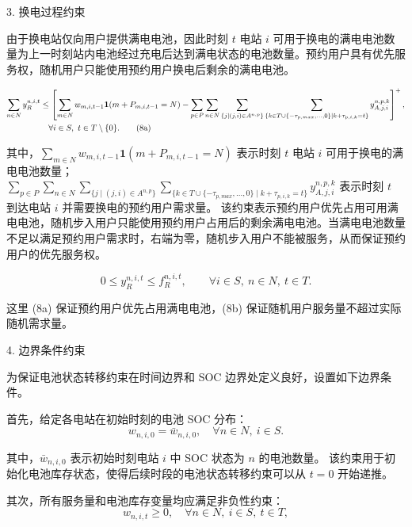 \documentclass[12pt,hyperref,a4paper,UTF8]{ctexart}
\begin{document}
3. 换电过程约束

由于换电站仅向用户提供满电电池，因此时刻 $t$ 电站 $i$ 可用于换电的满电电池数量为上一时刻站内电池经过充电后达到满电状态的电池数量。预约用户具有优先服务权，随机用户只能使用预约用户换电后剩余的满电电池。

\begin{align}
\sum_{n\in N} y^{n,i,t}_{R}
&\le
\left[
\sum_{m\in N} w_{m,i,t-1}
\mathbf{1}\!\left(m+P_{m,i,t-1}=N\right)
-
\sum_{p\in P}
\sum_{n\in N}
\sum_{\{j\mid (j,i)\in A^{n,p}\}}
\sum_{\{k\in T\cup\{-\tau_{p,max},...,0\}\mid k+\tau_{p,i,k}=t\}}
y^{n,p,k}_{A,j,i}
\right]^+, \notag \\  %
&\quad \forall i\in S,\ t\in T\setminus\{0\}.
\tag{8a}
\end{align}

其中，$\sum_{m\in N} w_{m,i,t-1}\mathbf{1}(m+P_{m,i,t-1}=N)$ 表示时刻 $t$ 电站 $i$ 可用于换电的满电电池数量；
$\sum_{p\in P}
\sum_{n\in N}
\sum_{\{j\mid (j,i)\in A^{n,p}\}}
\sum_{\{k\in T\cup\{-\tau_{p,max},...,0\}\mid k+\tau_{p,i,k}=t\}}
y^{n,p,k}_{A,j,i}$ 表示时刻 $t$ 到达电站 $i$ 并需要换电的预约用户需求量。
该约束表示预约用户优先占用可用满电电池，随机步入用户只能使用预约用户占用后的剩余满电电池。当满电电池数量不足以满足预约用户需求时，右端为零，随机步入用户不能被服务，从而保证预约用户的优先服务权。


\begin{equation}
0\le y^{n,i,t}_{R}\le f^{n,i,t}_{R},
\qquad
\forall i\in S,\ n\in N,\ t\in T.
\tag{8b}
\end{equation}

这里 (8a) 保证预约用户优先占用满电电池，(8b) 保证随机用户服务量不超过实际随机需求量。


4. 边界条件约束


为保证电池状态转移约束在时间边界和 SOC 边界处定义良好，设置如下边界条件。

首先，给定各电站在初始时刻的电池 SOC 分布：
\begin{equation}
w_{n,i,0}=\bar{w}_{n,i,0},
\quad \forall n\in N,\ i\in S.
\tag{9a}
\end{equation}

其中，$\bar{w}_{n,i,0}$ 表示初始时刻电站 $i$ 中 SOC 状态为 $n$ 的电池数量。
该约束用于初始化电池库存状态，使得后续时段的电池状态转移约束可以从 $t=0$ 开始递推。

其次，所有服务量和电池库存变量均应满足非负性约束：
\begin{equation}
w_{n,i,t}\ge 0,
\quad \forall n\in N,\ i\in S,\ t\in T,
\tag{9b}
\end{equation}
\end{document}
